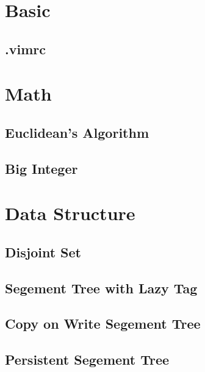 \documentclass[a4paper,10pt,twocolumn,oneside]{article}
\begin{document}
\pagestyle{fancy}
\fancyfoot{}
\fancyhead[R]{\thepage}
\renewcommand{\headrulewidth}{0.4pt}
\renewcommand{\contentsname}{Contents}

\scriptsize
\tableofcontents

\newpage

\section{Basic}
\subsection{.vimrc}


\section{Math}
\subsection{Euclidean's Algorithm}

\subsection{Big Integer}



\section{Data Structure}
\subsection{Disjoint Set}

\subsection{Segement Tree with Lazy Tag}

\subsection{Copy on Write Segement Tree}

\subsection{Persistent Segement Tree}

\end{document}
